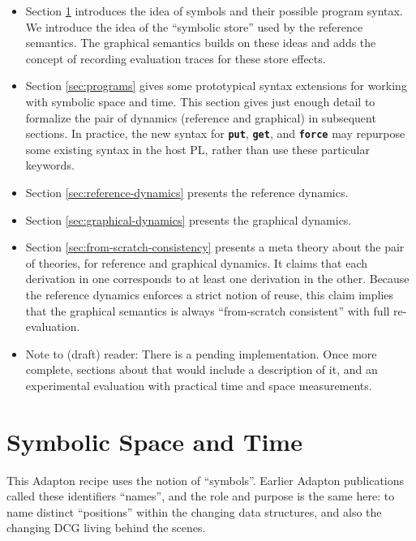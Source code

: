 \documentclass[11pt]{article}
\renewcommand{\ottkw}[1]{\textbf{\texttt{#1}}}
\begin{document}
\begin{itemize}

\item Section \ref{sec:symbolic-space-and-time} introduces the idea of symbols and their possible program syntax.  We introduce the idea of the ``symbolic store'' used by the reference semantics.  The graphical semantics builds on these ideas and adds the concept of recording evaluation traces for these store effects.
  
\item Section \ref{sec:programs} gives some prototypical syntax
  extensions for working with symbolic space and time.
  This section gives just enough detail to
  formalize the pair of dynamics (reference and graphical) in
  subsequent sections.
  In practice,
  the new syntax for \ottkw{put}, \ottkw{get}, and \ottkw{force} may
  repurpose some existing syntax in the host PL, rather than use these
  particular keywords.  

\item Section \ref{sec:reference-dynamics} presents the reference dynamics.

\item Section \ref{sec:graphical-dynamics} presents the graphical dynamics.

\item Section \ref{sec:from-scratch-consistency} presents a meta theory
  about the pair of theories, for reference and graphical dynamics.
  It claims that each derivation in one corresponds
  to at least one derivation in the other.  Because the reference
  dynamics enforces a strict notion of reuse, this claim implies that
  the graphical semantics is always ``from-scratch consistent'' with
  full re-evaluation.

\item Note to (draft) reader: There is a pending implementation.  Once more
  complete, sections about that would include a description of it, and
  an experimental evaluation with practical time and space
  measurements.
  
\end{itemize}


\section{Symbolic Space and Time}
\label{sec:symbolic-space-and-time}

This Adapton recipe uses the notion of ``symbols''.
%
Earlier Adapton publications called these identifiers ``names'', and
the role and purpose is the same here: to name distinct ``positions''
within the changing data structures, and also the changing DCG living
behind the scenes.
\end{document}
